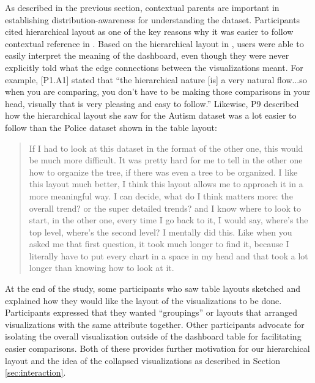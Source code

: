 \par As described in the previous section, contextual parents are important in establishing distribution-awareness for understanding the dataset. Participants cited hierarchical layout as one of the key reasons why it was easier to follow contextual reference in \system. Based on the hierarchical layout in \system, users were able to easily interpret the meaning of the dashboard, even though they were never explicitly told what the edge connections between the visualizations meant. For example, [P1.A1] stated that ``the hierarchical nature [is] a very natural flow...so when you are comparing, you don't have to be making those comparisons in your head, visually that is very pleasing and easy to follow.'' %
Likewise, P9 described how the hierarchical layout she saw for the Autism dataset was a lot easier to follow than the Police dataset shown in the table layout:
\begin{quote}
If I had to look at this dataset in the format of the other one, this would be much more difficult. It was pretty hard for me to tell in the other one how to organize the tree, if there was even a tree to be organized. I like this layout much better, I think this layout allows me to approach it in a more meaningful way. I can decide, what do I think matters more: the overall trend? or the super detailed trends? and I know where to look to start, in the other one, every time I go back to it, I would say, where's the top level, where's the second level? I mentally did this. Like when you asked me that first question, it took much longer to find it, because I literally have to put every chart in a space in my head and that took a lot longer than knowing how to look at it.
\end{quote}
At the end of the study, some participants who saw table layouts sketched and explained how they would like the layout of the visualizations to be done. Participants expressed that they wanted ``groupings'' or layouts that arranged visualizations with the same attribute together. Other participants advocate for isolating the overall visualization outside of the dashboard table for facilitating easier comparisons. Both of these provides further motivation for our hierarchical layout and the idea of the collapsed visualizations as described in Section \ref{sec:interaction}.
